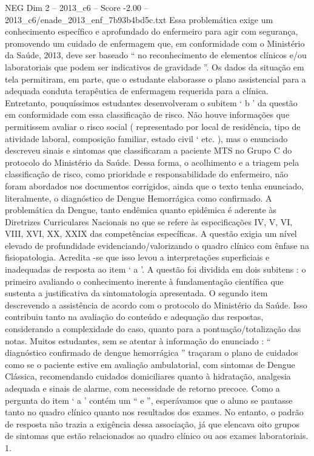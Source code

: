 \begin{textsample}{NEG Dim 2 – 2013\_c6 – Score -2.00 – 2013\_c6/enade\_2013\_enf\_7b93b4bd5c.txt}
Essa problemática exige um conhecimento específico e aprofundado do enfermeiro para agir com segurança, promovendo um cuidado de enfermagem que, em conformidade com o Ministério da Saúde, 2013, deve ser baseado “ no reconhecimento de elementos clínicos e/ou laboratoriais que podem ser indicativos de gravidade ”.
Os dados da situação em tela permitiram, em parte, que o estudante elaborasse o plano assistencial para a adequada conduta terapêutica de enfermagem requerida para a clínica.
Entretanto, pouquíssimos estudantes desenvolveram o subitem ‘ b ’ da questão em conformidade com essa classificação de risco.
Não houve informações que permitissem avaliar o risco social ( representado por local de residência, tipo de atividade laboral, composição familiar, estado civil ‘ etc. ), mas o enunciado descreveu sinais e sintomas que classificaram a paciente MTS no Grupo C do protocolo do Ministério da Saúde.
Dessa forma, o acolhimento e a triagem pela classificação de risco, como prioridade e responsabilidade do enfermeiro, não foram abordados nos documentos corrigidos, ainda que o texto tenha enunciado, literalmente, o diagnóstico de Dengue Hemorrágica como confirmado.
A problemática da Dengue, tanto endêmica quanto epidêmica é aderente às Diretrizes Curriculares Nacionais no que se refere às especificações IV, V, VI, VIII, XVI, XX, XXIX das competências específicas.
A questão exigia um nível elevado de profundidade evidenciando/valorizando o quadro clínico com ênfase na fisiopatologia.
Acredita -se que isso levou a interpretações superficiais e inadequadas de resposta ao item ‘ a ’.
A questão foi dividida em dois subitens : o primeiro avaliando o conhecimento inerente à fundamentação científica que sustenta a justificativa da sintomatologia apresentada.
O segundo item descrevendo a assistência de acordo com o protocolo do Ministério da Saúde.
Isso contribuiu tanto na avaliação do conteúdo e adequação das respostas, considerando a complexidade do caso, quanto para a pontuação/totalização das notas.
Muitos estudantes, sem se atentar à informação do enunciado : “ diagnóstico confirmado de dengue hemorrágica ” traçaram o plano de cuidados como se o paciente estive em avaliação ambulatorial, com sintomas de Dengue Clássica, recomendando cuidados domiciliares quanto à hidratação, analgesia adequada e sinais de alarme, com necessidade de retorno precoce.
Como a pergunta do item ‘ a ’ contém um “ e ”, esperávamos que o aluno se pautasse tanto no quadro clínico quanto nos resultados dos exames.
No entanto, o padrão de resposta não trazia a exigência dessa associação, já que elencava oito grupos de sintomas que estão relacionados ao quadro clínico ou aos exames laboratoriais. 1.

\end{textsample}
